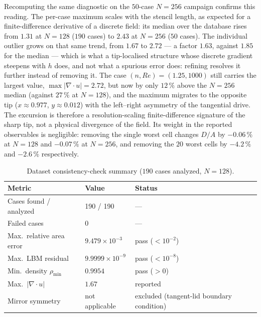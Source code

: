 \documentclass[11pt]{article}
\begin{document}
Recomputing the same diagnostic on the $50$-case $N=256$ campaign confirms
this reading. The per-case maximum scales with the stencil length, as expected
for a finite-difference derivative of a discrete field: its median over the
database rises from $1.31$ at $N=128$ ($190$ cases) to $2.43$ at $N=256$
($50$ cases). The individual outlier grows on that same trend, from $1.67$ to
$2.72$ --- a factor $1.63$, against $1.85$ for the median --- which is what a
tip-localised structure whose discrete gradient steepens with $h$ does, and not
what a spurious error does: refining resolves it further instead of removing
it. The case $(n,Re)=(1.25,1000)$ still carries the largest value,
$\max|\nabla\cdot u|=2.72$, but now by only $12\,\%$ above the $N=256$ median
(against $27\,\%$ at $N=128$), and the maximum migrates to the opposite tip
($x\approx0.977$, $y\approx0.012$) with the left--right asymmetry of the
tangential drive. The excursion is therefore a resolution-scaling
finite-difference signature of the sharp tip, not a physical divergence of
the field. Its weight in the reported observables is negligible: removing the
single worst cell changes $D/A$ by $-0.06\,\%$ at $N=128$ and $-0.07\,\%$ at
$N=256$, and removing the $20$ worst cells by $-4.2\,\%$ and $-2.6\,\%$
respectively.
\begin{table}[H]
\centering
\caption{Dataset consistency-check summary ($190$ cases analyzed, $N=128$).}




\label{tab:qc}
\begin{tabular}{@{}lll@{}}
\toprule
Metric & Value & Status \\
\midrule
Cases found / analyzed & 190 / 190 & --- \\
Failed cases & 0 & --- \\
Max.\ relative area error & $9.479\times10^{-3}$ & pass ($<10^{-2}$) \\
Max.\ LBM residual & $9.9999\times10^{-9}$ & pass ($<10^{-8}$) \\
Min.\ density $\rho_{\min}$ & $0.9954$ & pass ($>0$) \\
Max.\ $|\nabla\cdot u|$ & $1.67$ & reported \\
Mirror symmetry & not applicable & excluded (tangent-lid boundary condition) \\
\bottomrule
\end{tabular}
\end{table}
\par
\end{document}
